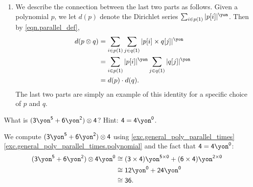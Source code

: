 \documentclass[Book-Poly]{subfiles}
\begin{document}
\begin{exercise}
\begin{solution}
\begin{enumerate}
	\item We describe the connection between the last two parts as follows.
	Given a polynomial $p$, we let $d(p)$ denote the Dirichlet series $\sum_{i \in p(\1)} |p[i]|^\yon$.
	Then by \eqref{eqn.parallel_def},
	\begin{align*}
	    d(p \otimes q) &= \sum_{i \in p(\1)} \sum_{j \in q(\1)} |p[i] \times q[j]|^\yon \\
	    &= \sum_{i \in p(\1)} |p[i]|^\yon \sum_{j \in q(\1)} |q[j]|^\yon \\
	    &= d(p) \cdot d(q).
	\end{align*}
	The last two parts are simply an example of this identity for a specific choice of $p$ and $q$.
\end{enumerate}
\end{solution}
\end{exercise}

\begin{exercise}
What is $(\3\yon^\5+\6\yon^\2)\otimes\4$? Hint: $\4=\4\yon^\0$.
\begin{solution}
We compute $(\3\yon^\5+\6\yon^\2)\otimes\4$ using \cref{exc.general_poly_parallel_times} \cref{exc.general_poly_parallel_times.polynomial} and the fact that $\4=\4\yon^\0$:
\begin{align*}
    (\3\yon^\5+\6\yon^\2)\otimes\4\yon^\0 &\iso (\3\times\4)\yon^{\5\times\0} + (\6\times\4)\yon^{\2\times\0} \\
    &\iso \1\2\yon^\0 + \2\4\yon^\0 \\
    &\iso \3\6.
\end{align*}
\end{solution}
\end{exercise}
\end{document}
